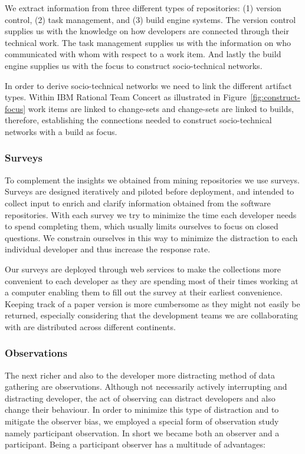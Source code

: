 We extract information from three different types of repositories: (1) version control, (2) task management, and (3) build engine systems.
The version control supplies us with the knowledge on how developers are connected through their technical work.
The task management supplies us with the information on who communicated with whom with respect to a work item.
And lastly the build engine supplies us with the focus to construct socio-technical networks.

In order to derive socio-technical networks we need to link the different artifact types.
Within IBM Rational Team Concert as illustrated in Figure~\ref{fig:construct-focus} work items are linked to change-sets and change-sets are linked to builds, therefore, establishing the connections needed to construct socio-technical networks with a build as focus.

\subsubsection{Surveys}
To complement the insights we obtained from mining repositories we use surveys.
Surveys are designed iteratively and piloted before deployment, and intended to collect input to enrich and clarify information obtained from the software repositories. 
With each survey we try to minimize the time each developer needs to spend completing them, which usually limits ourselves to focus on closed questions.
We constrain ourselves in this way to minimize the distraction to each individual developer and thus increase the response rate.

Our surveys are deployed through web services to make the collections more convenient to each developer as they are spending most of their times working at a computer enabling them to fill out the survey at their earliest convenience.
Keeping track of a paper version is more cumbersome as they might not easily be returned, especially considering that the development teams we are collaborating with are distributed across different continents.


\subsubsection{Observations}
The next richer and also to the developer more distracting method of data gathering are observations.
Although not necessarily actively interrupting and distracting developer, the act of observing can distract developers and also change their behaviour.
In order to minimize this type of distraction and to mitigate the observer bias, we employed a special form of observation study namely participant observation.
In short we became both an observer and a participant.
%
Being a participant observer has a multitude of advantages:

